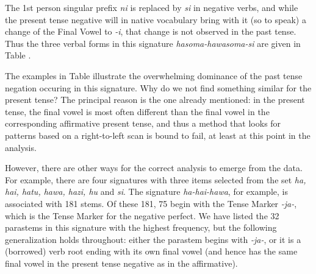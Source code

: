 \documentclass[output=paper,colorlinks,citecolor=brown]{langscibook}
\begin{document}
 The 1st person singular prefix \textit{ni} is replaced by \textit{si} in negative verbs, and while the present tense negative will in native vocabulary bring with it (so to speak) a change of the Final Vowel to \textit{-i}, that change is not observed in the past tense. Thus the three verbal forms in this signature \textit{hasoma-hawasoma-si} are given in Table .
 
The examples in Table  illustrate the overwhelming dominance of the past tense negation occuring in this signature. Why do we not find something similar for the present tense? The principal reason is the one already mentioned: in the present tense, the final vowel is most often different than the final vowel in the corresponding affirmative present tense, and thus a method that looks for patterns based on a right-to-left scan is bound to fail, at least at this point in the analysis.

However, there are other ways for the correct analysis to emerge from the data. For example, there are four signatures with three items selected from the set \textit{ha, hai, hatu, hawa, hazi, hu} and \textit{si}. The signature \textit{ha-hai-hawa}, for example, is associated with 181 stems. Of these 181, 75 begin with the Tense Marker \textit{-ja-}, which is the Tense Marker for the negative perfect. We have listed the 32 parastems in this signature with the highest frequency, but the following generalization holds throughout: either the parastem begins with \textit{-ja-}, or it is a (borrowed) verb root ending with its own final vowel (and hence has the same final vowel in the present tense negative as in the affirmative).
\end{document}
